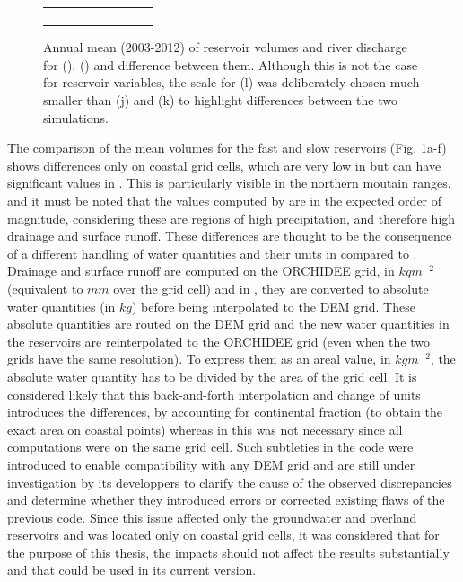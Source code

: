 \begin{figure}[htbp]
\begin{tabular}{ccc}
\begin{subfigure}[b]{0.33\textwidth}
        \end{subfigure} \\
    \end{tabular}
    \caption{Annual mean (2003-2012) of reservoir volumes and river discharge for \std (\noirr), \native (\noirr) and difference between them. 
    Although this is not the case for reservoir variables, the scale for (l) was deliberately chosen much smaller than (j) and (k) to highlight differences between the two simulations.}
    \label{fig:routing_reservoirs_halfdeg}
\end{figure}

The comparison of the mean volumes for the fast and slow reservoirs (Fig. \ref{fig:routing_reservoirs_halfdeg}a-f) shows differences only on coastal grid cells, which are very low in \std but can have significant values in \native. This is particularly visible in the northern moutain ranges, and it must be noted that the values computed by \native are in the expected order of magnitude, considering these are regions of high precipitation, and therefore high drainage and surface runoff.
These differences are thought to be the consequence of a different handling of water quantities and their units in \native compared to \std. Drainage and surface runoff are computed on the ORCHIDEE grid, in $kg m^{-2}$ (equivalent to $mm$ over the grid cell) and in \native, they are  converted to absolute water quantities (in $kg$) before being interpolated to the DEM grid. These absolute quantities are routed on the DEM grid and the new water quantities in the reservoirs are reinterpolated to the ORCHIDEE grid (even when the two grids have the same resolution). 
To express them as an areal value, in $kg m^{-2}$, the absolute water quantity has to be divided by the area of the grid cell. It is considered likely that this back-and-forth interpolation and change of units introduces the differences, by accounting for continental fraction (to obtain the exact area on coastal points) whereas in \std this was not necessary since all computations were on the same grid cell. Such subtleties in the code were introduced to enable compatibility with any DEM grid and are still under investigation by its developpers to clarify the cause of the observed discrepancies and determine whether they introduced errors or corrected existing flaws of the previous code.
Since this issue affected only the groundwater and overland reservoirs and was located only on coastal grid cells, it was considered that for the purpose of this thesis, the impacts should not affect the results substantially and that \native could be used in its current version.


